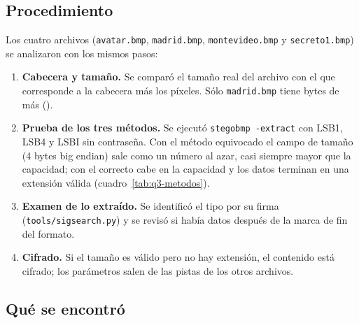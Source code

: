 
\subsection{Procedimiento}

Los cuatro archivos (\texttt{avatar.bmp}, \texttt{madrid.bmp}, \texttt{montevideo.bmp} y \texttt{secreto1.bmp}) se analizaron con los mismos pasos:
\begin{enumerate}
\item \textbf{Cabecera y tamaño.} Se comparó el tamaño real del archivo con el que corresponde a la cabecera más los píxeles. Sólo \texttt{madrid.bmp}
tiene bytes de más ().
\item \textbf{Prueba de los tres métodos.} Se ejecutó \texttt{stegobmp -extract} con LSB1, LSB4 y LSBI sin contraseña. Con el método equivocado el campo de
tamaño (4 bytes big endian) sale como un número al azar, casi siempre mayor que la capacidad; con el correcto cabe en la capacidad y los datos
terminan en una extensión válida (cuadro~\ref{tab:q3-metodos}).
\item \textbf{Examen de lo extraído.} Se identificó el tipo por su firma (\texttt{tools/sigsearch.py}) y se revisó si había datos después de la marca de fin
del formato.
\item \textbf{Cifrado.} Si el tamaño es válido pero no hay extensión, el contenido está cifrado; los parámetros salen de las pistas de los otros archivos.
\end{enumerate}

\begin{table}[htbp]
\centering
\small
\renewcommand{\arraystretch}{1.1}

\caption{Resultado de \texttt{stegobmp -extract} con cada método, sin contraseña}
\label{tab:q3-metodos}
\end{table}

\subsection{Qué se encontró}

